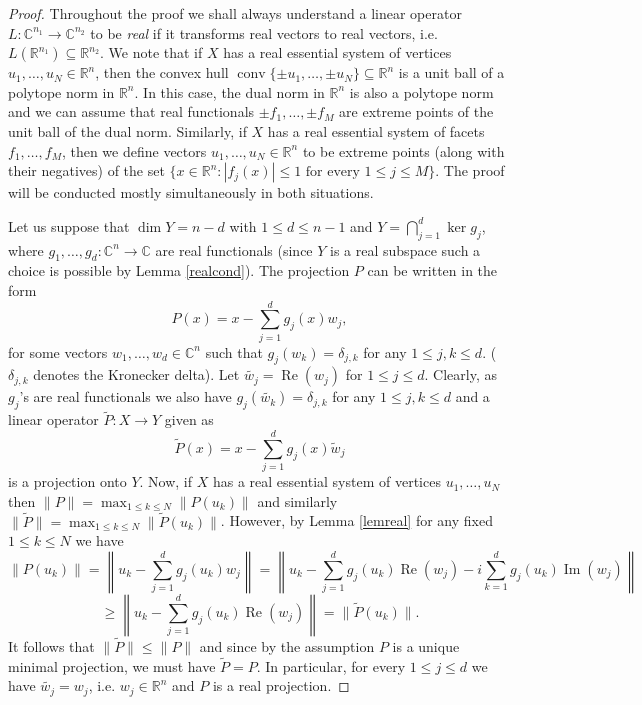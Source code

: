\documentclass[12pt, reqno]{amsart}
\theoremstyle{definition}
\theoremstyle{remark}
\numberwithin{equation}{section}
\DeclareMathOperator{\conv}{conv}
\DeclareMathOperator{\re}{Re}
\DeclareMathOperator{\im}{Im}
\begin{document}
\begin{proof}
Throughout the proof we shall always understand a linear operator $L: \mathbb{C}^{n_1} \to \mathbb{C}^{n_2}$ to be \emph{real} if it transforms real vectors to real vectors, i.e. $L(\mathbb{R}^{n_1}) \subseteq \mathbb{R}^{n_2}$. We note that if $X$ has a real essential system of vertices $u_1, \ldots, u_N \in \mathbb{R}^n$, then the convex hull $\conv\{ \pm u_1, \ldots, \pm u_N \} \subseteq \mathbb{R}^n$ is a unit ball of a polytope norm in $\mathbb{R}^n$. In this case, the dual norm in $\mathbb{R}^n$ is also a polytope norm and we can assume that real functionals $\pm f_1, \ldots, \pm f_M$ are extreme points of the unit ball of the dual norm. Similarly, if $X$ has a real essential system of facets $f_1, \ldots, f_M$, then we define vectors $u_1, \ldots, u_N \in \mathbb{R}^n$ to be extreme points (along with their negatives) of the set $\{ x \in \mathbb{R}^n: |f_j(x)| \leq 1 \text{ for every } 1 \leq j \leq M\}$. The proof will be conducted mostly simultaneously in both situations.

Let us suppose that $\dim Y = n-d$ with $1 \leq d \leq n-1$ and $Y = \bigcap_{j=1}^{d} \ker g_j$, where $g_1, \ldots, g_d: \mathbb{C}^n \to \mathbb{C}$ are real functionals (since $Y$ is a real subspace such a choice is possible by Lemma \ref{realcond}). The projection $P$ can be written in the form
$$P(x) = x - \sum_{j=1}^{d} g_j(x) w_j,$$
for some vectors $w_1, \ldots, w_d \in \mathbb{C}^n$ such that $g_j(w_k) = \delta_{j, k}$ for any $1 \leq j, k \leq d$. ($\delta_{j, k}$ denotes the Kronecker delta). Let $\widetilde{w_j}=\re(w_j)$ for $1 \leq j \leq d$. Clearly, as $g_j$'s are real functionals we also have $g_j(\widetilde{w_k})=\delta_{j, k}$ for any $1 \leq j, k \leq d$ and a linear operator $\widetilde{P}:X \to Y$ given as
$$\widetilde{P}(x) = x - \sum_{j=1}^{d} g_j(x) \widetilde{w}_j$$
is a projection onto $Y$. Now, if $X$ has a real essential system of vertices $u_1, \ldots, u_N$ then $\|P\| = \max_{1 \leq k \leq N} \|P(u_k)\|$ and similarly $\|\widetilde{P}\| = \max_{1 \leq k \leq N} \|\widetilde{P}(u_k)\|$. However, by Lemma \ref{lemreal} for any fixed $1 \leq k \leq N$ we have
$$\|P(u_k)\| = \left \| u_k - \sum_{j=1}^{d} g_j(u_k) w_j \right \| = \left \| u_k - \sum_{j=1}^{d} g_j(u_k) \re(w_j) - i \sum_{k=1}^{d} g_j(u_k) \im(w_j) \right \|$$
$$\geq \left \| u_k - \sum_{j=1}^{d} g_j(u_k) \re(w_j) \right \| = \|\widetilde{P}(u_k)\|.$$
It follows that $\|\widetilde{P}\| \leq \|P\|$ and since by the assumption $P$ is a unique minimal projection, we must have $\widetilde{P}=P$. In particular, for every $1 \leq j \leq d$ we have $\widetilde{w_j}=w_j$, i.e. $w_j \in \mathbb{R}^n$ and $P$ is a real projection.


\end{proof}
\end{document}
